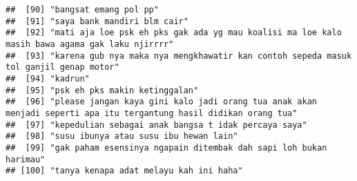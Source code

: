 \documentclass[
]{article}
\begin{document}
\begin{verbatim}
##  [90] "bangsat emang pol pp"                                                                                                                                                                                                                                                              
##  [91] "saya bank mandiri blm cair"                                                                                                                                                                                                                                                        
##  [92] "mati aja loe psk eh pks gak ada yg mau koalisi ma loe kalo masih bawa agama gak laku njirrrr"                                                                                                                                                                                      
##  [93] "karena gub nya maka nya mengkhawatir kan contoh sepeda masuk tol ganjil genap motor"                                                                                                                                                                                               
##  [94] "kadrun"                                                                                                                                                                                                                                                                            
##  [95] "psk eh pks makin ketinggalan"                                                                                                                                                                                                                                                      
##  [96] "please jangan kaya gini kalo jadi orang tua anak akan menjadi seperti apa itu tergantung hasil didikan orang tua"                                                                                                                                                                  
##  [97] "kepedulian sebagai anak bangsa t idak percaya saya"                                                                                                                                                                                                                                
##  [98] "susu ibunya atau susu ibu hewan lain"                                                                                                                                                                                                                                              
##  [99] "gak paham esensinya ngapain ditembak dah sapi loh bukan harimau"                                                                                                                                                                                                                   
## [100] "tanya kenapa adat melayu kah ini haha"
\end{verbatim}
\end{document}
